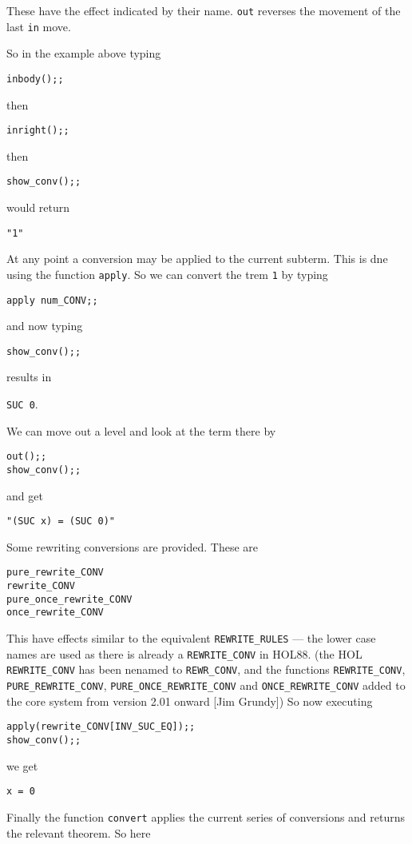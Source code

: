 These have the effect indicated by their name. \verb!out! reverses the movement of the last \verb!in!
move.

So in the example above typing

\verb!inbody();;!

then

\verb!inright();;!

then

\verb!show_conv();;!

would return

\verb!"1"!

At any point a conversion may be applied to the current subterm. This is dne using the function \verb!apply!.
So we can convert the trem \verb!1! by typing

\verb!apply num_CONV;;!

and now typing

\verb!show_conv();;!

results in

\verb!SUC 0!.

We can move out a level and look at the term there by

\begin{verbatim}
out();;
show_conv();;
\end{verbatim}

and get

\verb!"(SUC x) = (SUC 0)"!

Some rewriting conversions are provided. These are

\begin{verbatim}
pure_rewrite_CONV
rewrite_CONV
pure_once_rewrite_CONV
once_rewrite_CONV
\end{verbatim}

This have effects similar to the equivalent \verb!REWRITE_RULES! --- the lower case names are used
as there is already a \verb!REWRITE_CONV! in HOL88.
(the HOL \verb!REWRITE_CONV! has been nenamed to \verb!REWR_CONV!,
 and the functions
 \verb!REWRITE_CONV!, \verb!PURE_REWRITE_CONV!, \verb!PURE_ONCE_REWRITE_CONV!
 and \verb!ONCE_REWRITE_CONV! added to the core system from version 2.01
 onward [Jim Grundy])
So now executing

\begin{verbatim}
apply(rewrite_CONV[INV_SUC_EQ]);;
show_conv();;
\end{verbatim}

we get

\verb!x = 0!

Finally the function \verb!convert! applies the current series of conversions and returns the relevant
theorem. So here

